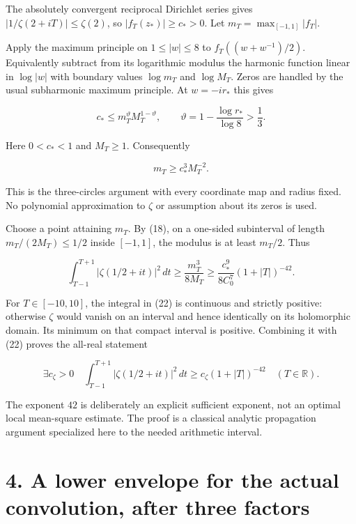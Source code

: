 \documentclass[11pt,a4paper]{article}
\begin{document}
The absolutely convergent reciprocal Dirichlet series gives
\(|1/\zeta(2+iT)|\le\zeta(2)\), so \(|f_T(z_*)|\ge c_*>0\). Let
\(m_T=\max_{[-1,1]}|f_T|\).

Apply the maximum principle on \(1\le|w|\le8\) to \(f_T((w+w^{-1})/2)\).
Equivalently subtract from its logarithmic modulus the harmonic function
linear in \(\log|w|\) with boundary values \(\log m_T\) and
\(\log M_T\). Zeros are handled by the usual subharmonic maximum
principle. At \(w=-ir_*\) this gives

\[
 c_*\le m_T^{\vartheta}M_T^{1-\vartheta},\qquad
 \vartheta=1-\frac{\log r_*}{\log8}>\frac13.
                                                                         \tag{20}
\]

Here \(0<c_*<1\) and \(M_T\ge1\). Consequently

\[
 m_T\ge c_*^3M_T^{-2}.                                                 \tag{21}
\]

This is the three-circles argument with every coordinate map and radius
fixed. No polynomial approximation to \(\zeta\) or assumption about its
zeros is used.

Choose a point attaining \(m_T\). By (18), on a one-sided subinterval of
length \(m_T/(2M_T)\le1/2\) inside \([-1,1]\), the modulus is at least
\(m_T/2\). Thus

\[
 \int_{T-1}^{T+1}|\zeta(1/2+it)|^2\,dt
 \ge \frac{m_T^3}{8M_T}
 \ge \frac{c_*^9}{8C_0^7}(1+|T|)^{-42}.                                \tag{22}
\]

For \(T\in[-10,10]\), the integral in (22) is continuous and strictly
positive: otherwise \(\zeta\) would vanish on an interval and hence
identically on its holomorphic domain. Its minimum on that compact
interval is positive. Combining it with (22) proves the all-real
statement

\[
 \boxed{\exists c_\zeta>0\quad
 \int_{T-1}^{T+1}|\zeta(1/2+it)|^2\,dt
 \ge c_\zeta(1+|T|)^{-42}\quad(T\in\mathbb R).}                         \tag{23}
\]

The exponent \(42\) is deliberately an explicit sufficient exponent, not
an optimal local mean-square estimate. The proof is a classical analytic
propagation argument specialized here to the needed arithmetic interval.

\section{4. A lower envelope for the actual convolution, after three
factors}\label{a-lower-envelope-for-the-actual-convolution-after-three-factors}
\end{document}
